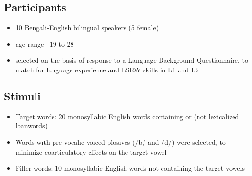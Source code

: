 \documentclass[11pt]{article}
\newcommand{\nt}[1]{\textipa{[#1]}} %
\begin{document}
\subsection{Participants}

\begin{itemize}
	\item 10 Bengali-English bilingual speakers (5 female)
	\item age range-- 19 to 28
	\item selected on the basis of response to a Language Background Questionnaire, to match for language experience and LSRW skills in L1 and L2 
\end{itemize}

\subsection{Stimuli}
\begin{itemize}
	\item Target words: 20 monosyllabic English words containing \nt{2} or \nt{ae} (not lexicalized loanwords)
	\item Words with pre-vocalic voiced plosives (/b/ and /d/) were selected, to minimize coarticulatory effects on the target vowel
	\item Filler words: 10 monosyllabic English words not containing the target vowels
\end{itemize}
\end{document}
